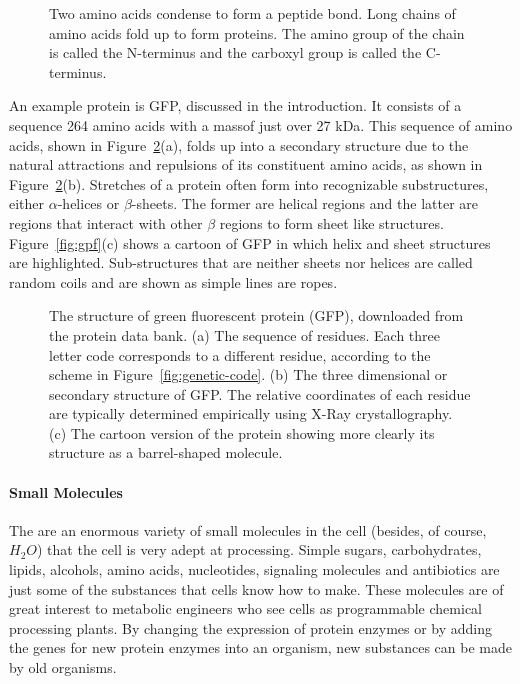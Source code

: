 \begin{figure}
\centering
{}
\caption{Two amino acids condense to form a peptide bond. Long chains
  of amino acids fold up to form proteins. The amino group of the
  chain is called the N-terminus and the carboxyl group is called the
  C-terminus. \label{fig:peptide-bond}}
\end{figure}

An example protein is GFP, discussed in the introduction. It consists
of a sequence 264 amino acids with a mass\footnotemark of just over 27
kDa. This sequence of amino acids, shown in Figure~\ref{fig:gfp}(a),
folds up into a secondary structure due to the natural attractions and
repulsions of its constituent amino acids, as shown in
Figure~\ref{fig:gfp}(b). Stretches of a protein often form into
recognizable substructures, either $\alpha$-helices or
$\beta$-sheets. The former are helical regions and the latter are
regions that interact with other $\beta$ regions to form sheet like
structures. Figure~\ref{fig:gpf}(c) shows a cartoon of GFP in which helix
and sheet structures are highlighted. Sub-structures that are neither
sheets nor helices are called random coils and are shown as simple
lines are ropes. 


\begin{figure}
\centering
{}
\caption{The structure of green fluorescent protein (GFP), downloaded
  from the protein data bank. (a) The sequence of residues. Each
  three letter code corresponds to a different residue, according to
  the scheme in Figure~\ref{fig:genetic-code}. (b) The three
  dimensional or secondary structure of GFP. The relative coordinates
  of each residue are typically determined empirically using X-Ray
  crystallography. (c) The cartoon version of the protein showing more
  clearly its structure as a barrel-shaped molecule. \label{fig:gfp} }\end{figure}

\paragraph{Small Molecules} The are an enormous variety of small
molecules in the cell (besides, of course, $H_2O$) that the cell is
very adept at processing. Simple sugars, carbohydrates, lipids,
alcohols, amino acids, nucleotides, signaling molecules and
antibiotics are just some of the substances that cells know how to
make. These molecules are of great interest to metabolic engineers who
see cells as programmable chemical processing plants. By changing the
expression of protein enzymes or by adding the genes for new protein
enzymes into an organism, new substances can be made by old organisms. 


